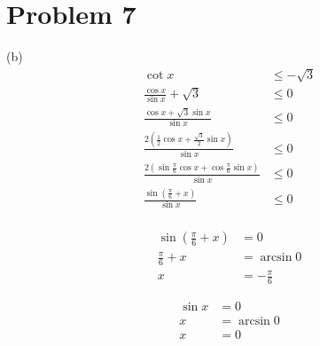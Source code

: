 \documentclass{article}
\begin{document}
\section*{Problem 7}
\begin{itemize}
\begin{minipage}[t]{.45\textwidth}
\item[(b)]
	\begin{align*}
		\cot x&\leq-\sqrt{3} \\
		\frac{\cos x}{\sin x}+\sqrt{3}&\leq0 \\
		\frac{\cos x+\sqrt{3}\sin x}{\sin x}&\leq0 \\
		\frac{2\left(\frac{1}{2}\cos x+
			\frac{\sqrt{3}}{2}\sin x\right)}{\sin x}&\leq0 \\
		\frac{2\left(\sin\frac{\pi}{6}\cos x+
			\cos\frac{\pi}{6}\sin x\right)}{\sin x}&\leq0 \\
		\frac{\sin\left(\frac{\pi}{6}+x\right)}{\sin x}&\leq0 \\
	\end{align*}
	\begin{minipage}[t]{.5\textwidth}
		\begin{align*}
			\sin\left(\frac{\pi}{6}+x\right)&=0 \\
			\frac{\pi}{6}+x&=\arcsin0 \\
			x&=-\frac{\pi}{6}
		\end{align*}
	\end{minipage}
	\begin{minipage}[t]{.32\textwidth}
		\begin{align*}
			\sin x&=0 \\
			x&=\arcsin0 \\
			x&=0
		\end{align*}
	\end{minipage}


\end{minipage}
\end{itemize}
\end{document}
